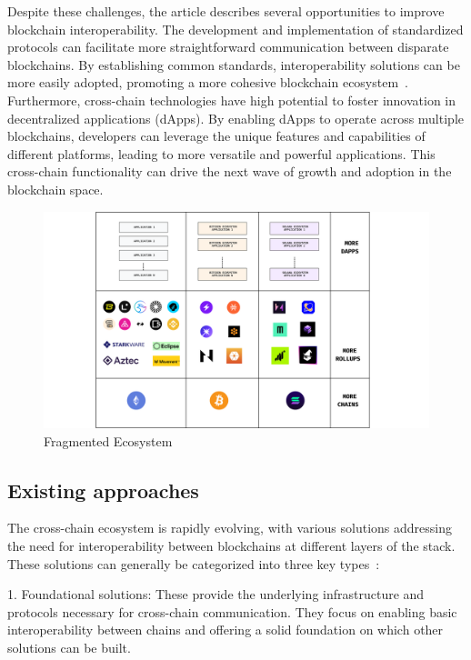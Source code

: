 Despite these challenges, the article describes several opportunities to improve blockchain interoperability. The development and implementation of standardized protocols can facilitate more straightforward communication between disparate blockchains. By establishing common standards, interoperability solutions can be more easily adopted, promoting a more cohesive blockchain ecosystem~\cite{mao}. Furthermore, cross-chain technologies have high potential to foster innovation in decentralized applications (dApps). By enabling dApps to operate across multiple blockchains, developers can leverage the unique features and capabilities of different platforms, leading to more versatile and powerful applications. This cross-chain functionality can drive the next wave of growth and adoption in the blockchain space. 

\begin{figure}[h!]
    \centering
    \includegraphics[width=0.99\linewidth]{figure/fragmented.png}
    \caption{Fragmented Ecosystem}
    \label{fig:fragmented}
\end{figure}


\subsection{Existing approaches}

The cross-chain ecosystem is rapidly evolving, with various solutions addressing the need for interoperability between blockchains at different layers of the stack. These solutions can generally be categorized into three key types~\cite{particle}:

1. Foundational solutions: These provide the underlying infrastructure and protocols necessary for cross-chain communication. They focus on enabling basic interoperability between chains and offering a solid foundation on which other solutions can be built.


